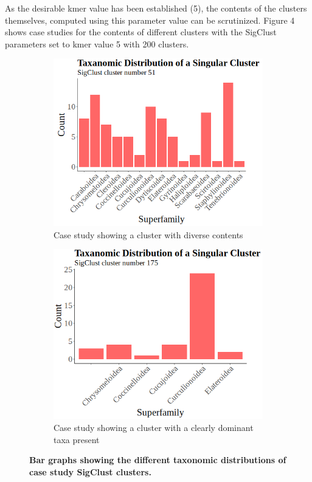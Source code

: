 \documentclass[12pt]{article}
\begin{document}
  As the desirable kmer value has been established (5), the contents of the clusters themselves, computed using this parameter value can be scrutinized. Figure 4 shows case studies for the contents of different clusters with the SigClust parameters set to kmer value 5 with 200 clusters.

  \begin{figure}[H]
    \centering
    \begin{subfigure}{0.495\textwidth}
      \includegraphics[width=\linewidth]{cluster_51.png}
      \caption{Case study showing a cluster with diverse contents}
    \end{subfigure}
    \begin{subfigure}{0.495\textwidth}
      \includegraphics[width=\linewidth]{cluster_175.png}
      \caption{Case study showing a cluster with a clearly dominant taxa present}
    \end{subfigure}
    \captionsetup{margin=0.75cm}
      \caption{\textbf{\small Bar graphs showing the different taxonomic distributions of case study SigClust clusters.}}
  \end{figure}
\end{document}

